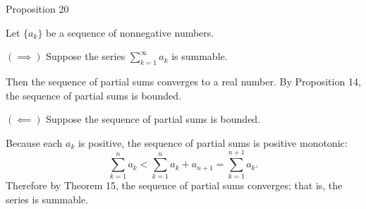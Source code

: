 \begin{flushleft}
\begin{namedthm*}{Proposition 20}
\begin{enumerate}[label=(\roman*),align=left]
		Let $\{a_k\}$ be a sequence of nonnegative numbers.\par
		$(\implies)$ Suppose the series $\sum_{k=1}^\infty a_k$ is summable.\par
		Then the sequence of partial sums converges to a real number.
		By Proposition 14, the sequence of partial sums is  bounded.
		\par
		$(\impliedby)$ Suppose the sequence of partial sums is bounded.\par
		Because each $a_k$ is positive, the sequence of partial sums is positive monotonic:
		\[
			\sum_{k=1}^n a_k < \sum_{k=1}^n a_k + a_{n+1} = \sum_{k=1}^{n+1} a_k.
		\]
		Therefore by Theorem 15, the sequence of partial sums converges; that is, the series is summable.
	\end{enumerate}	
\end{namedthm*}


\end{flushleft}

